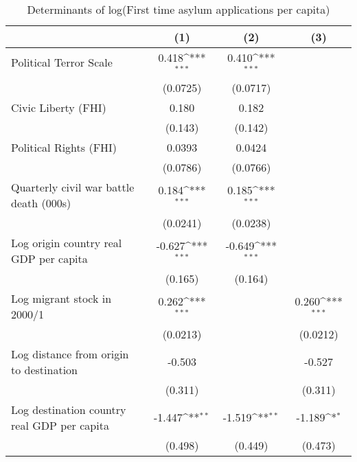 \begin{table}[htbp]\centering
\def\sym#1{\ifmmode^{#1}\else\(^{#1}\)\fi}
\caption{Determinants of log(First time asylum applications per capita)}
\begin{tabular}{l*{3}{c}}
\hline\hline
                    &\multicolumn{1}{c}{(1)}         &\multicolumn{1}{c}{(2)}         &\multicolumn{1}{c}{(3)}         \\
\hline
Political Terror Scale&       0.418\sym{***}&       0.410\sym{***}&                     \\
                    &    (0.0725)         &    (0.0717)         &                     \\
[1em]
Civic Liberty (FHI) &       0.180         &       0.182         &                     \\
                    &     (0.143)         &     (0.142)         &                     \\
[1em]
Political Rights (FHI)&      0.0393         &      0.0424         &                     \\
                    &    (0.0786)         &    (0.0766)         &                     \\
[1em]
Quarterly civil war battle death (000s)&       0.184\sym{***}&       0.185\sym{***}&                     \\
                    &    (0.0241)         &    (0.0238)         &                     \\
[1em]
Log origin country real GDP per capita&      -0.627\sym{***}&      -0.649\sym{***}&                     \\
                    &     (0.165)         &     (0.164)         &                     \\
[1em]
Log migrant stock in 2000/1&       0.262\sym{***}&                     &       0.260\sym{***}\\
                    &    (0.0213)         &                     &    (0.0212)         \\
[1em]
Log distance from origin to destination&      -0.503         &                     &      -0.527         \\
                    &     (0.311)         &                     &     (0.311)         \\
[1em]
Log destination country real GDP per capita&      -1.447\sym{**} &      -1.519\sym{**} &      -1.189\sym{*}  \\
                    &     (0.498)         &     (0.449)         &     (0.473)         \\

\end{tabular}
\end{table}
